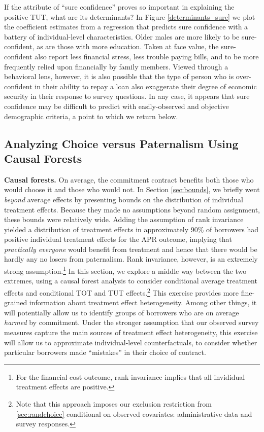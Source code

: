 \documentclass[ecta,nameyear,final]{econsocart}
\begin{document}
If the attribute of ``sure confidence'' proves so important in explaining the positive TUT, what are its determinants? In Figure \ref{determinants_sure} we plot the coefficient estimates from a regression that predicts sure confidence with a battery of individual-level characteristics.  Older males are more likely to be sure-confident, as are those with more education.  Taken at face value, the sure-confident also report less financial stress, less trouble paying bills, and to be more frequently relied upon financially by family members.  Viewed through a behavioral lens, however, it is also possible that the type of person who is over-confident in their ability to repay a loan also %
exaggerate their degree of economic security in their response to survey questions. In any case, it appears that sure confidence may be difficult to predict with easily-observed and objective demographic criteria, a point to which we return below.


\subsection{Analyzing Choice versus Paternalism Using Causal Forests} \label{sec:RF}


\noindent \textbf{Causal forests.} 
On average, the commitment contract benefits both those who would choose it and those who would not.
In Section \ref{sec:bounds}, we briefly went \emph{beyond} average effects by presenting bounds on the distribution of individual treatment effects.
Because they made no assumptions beyond random assignment, these bounds were relatively wide.
Adding the assumption of rank invariance yielded a distribution of treatment effects in approximately 90\% of borrowers had positive individual treatment effects for the APR outcome, implying that \emph{practically everyone} would benefit from treatment and hence that there would be hardly any no losers from paternalism.
Rank invariance, however, is an extremely strong assumption.\footnote{For the financial cost outcome, rank invariance implies that all invididual treatment effects are positive.}
In this section, we explore a middle way between the two extremes, using a causal forest analysis to consider conditional average treatment effects and conditional TOT and TUT effects.\footnote{Note that this approach imposes our exclusion restriction from \ref{sec:randchoice} conditional on observed covariates: administrative data and survey responses.} 
This exercise provides more fine-grained information about treatment effect heterogeneity.
Among other things, it will potentially allow us to identify groups of borrowers who are on average \emph{harmed} by commitment.
Under the stronger assumption that our observed survey measures capture the main sources of treatment effect heterogeneity, this exercise will allow us to approximate individual-level counterfactuals, to consider whether particular borrowers made ``mistakes'' in their choice of contract. 
\end{document}
